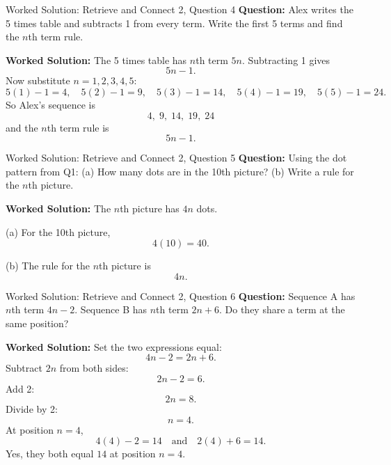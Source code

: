 \documentclass{beamer}
\begin{document}
\begin{frame}{Worked Solution: Retrieve and Connect 2, Question 4}
\textbf{Question:} Alex writes the 5 times table and subtracts 1 from every term. Write the first 5 terms and find the $n$th term rule.

\textbf{Worked Solution:} The 5 times table has $n$th term $5n$. Subtracting 1 gives
\[
5n-1.
\]
Now substitute $n=1,2,3,4,5$:
\[
5(1)-1=4,\quad 5(2)-1=9,\quad 5(3)-1=14,\quad 5(4)-1=19,\quad 5(5)-1=24.
\]
So Alex's sequence is
\[
4,\;9,\;14,\;19,\;24
\]
and the $n$th term rule is
\[
5n-1.
\]
\end{frame}

\begin{frame}{Worked Solution: Retrieve and Connect 2, Question 5}
\textbf{Question:} Using the dot pattern from Q1: (a) How many dots are in the 10th picture? (b) Write a rule for the $n$th picture.

\textbf{Worked Solution:} The $n$th picture has $4n$ dots.

(a) For the 10th picture,
\[
4(10)=40.
\]

(b) The rule for the $n$th picture is
\[
4n.
\]
\end{frame}

\begin{frame}{Worked Solution: Retrieve and Connect 2, Question 6}
\textbf{Question:} Sequence A has $n$th term $4n-2$. Sequence B has $n$th term $2n+6$. Do they share a term at the same position?

\textbf{Worked Solution:} Set the two expressions equal:
\[
4n-2=2n+6.
\]
Subtract $2n$ from both sides:
\[
2n-2=6.
\]
Add 2:
\[
2n=8.
\]
Divide by 2:
\[
n=4.
\]
At position $n=4$,
\[
4(4)-2=14 \quad\text{and}\quad 2(4)+6=14.
\]
Yes, they both equal $14$ at position $n=4$.
\end{frame}
\end{document}
